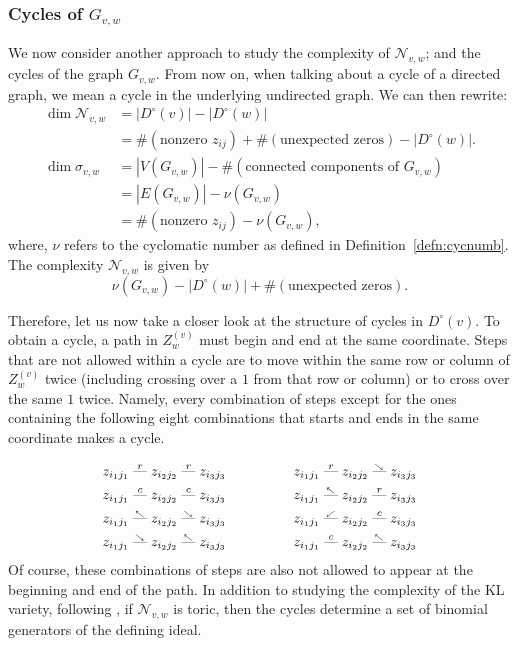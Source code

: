 \documentclass[11pt]{amsart}
\theoremstyle{definition}
\theoremstyle{definition}
\theoremstyle{definition}
\theoremstyle{definition}
\newcommand{\Gvwt}{G_{v,w}}
\newcommand{\Nvw}{\mathcal{N}_{v,w}}
\newcommand{\Dc}{D^{\circ}}
\newcommand{\dash}{\text{---}}
\newcommand{\Zg}{Z^{(v)}_w}
\newcommand{\cn}{\nu}
\begin{document}
\subsubsection{Cycles of $\Gvwt$}\label{subsec: cycles of Gvw}
\noindent We now consider another approach to study the complexity of $\Nvw$; and the cycles of the graph $\Gvwt$. From now on, when talking about a cycle of a directed graph, we mean a cycle in the underlying undirected graph. We can then rewrite:
\begin{align*}
\dim \Nvw &= |\Dc(v)| - |\Dc(w)| \\
&= \# (\text{nonzero } z_{ij} ) + \# (\text{unexpected zeros}) - |\Dc(w)|.\\
\dim \sigma_{v,w} &= |V(\Gvwt)| - \#(\text{connected components of } \Gvwt) \\
&= |E(\Gvwt)| - \cn( \Gvwt )\\
& = \# (\text{nonzero } z_{ij} )- \cn( \Gvwt),
\end{align*}
where, $\nu$ refers to the cyclomatic number as defined in Definition~\ref{defn:cycnumb}.
The complexity $\Nvw$ is given by
$$ \cn (\Gvwt) - |\Dc(w)| + \# (\text{unexpected zeros}).$$

Therefore, let us now take a closer look at the structure of cycles in $\Dc(v)$. To obtain a cycle, a path in $\Zg$ must begin and end at the same coordinate. Steps that are not allowed within a cycle are to move within the same row or column of $\Zg$ twice (including crossing over a $1$ from that row or column) or to cross over the same $1$ twice. Namely, every combination of steps except for the ones containing the following eight combinations that starts and ends in the same coordinate makes a cycle. 

\begin{align*}
z_{i_1 j_1} \stackrel{r}{\dash} z_{i_2 j_2} \stackrel{r}{\dash}  z_{i_3 j_3} \hspace{1.7cm}&
z_{i_1 j_1} \stackrel{r}{\dash} z_{i_2 j_2} \stackrel{_{\searrow}}{\dash}  z_{i_3 j_3} \\
z_{i_1 j_1} \stackrel{c}{\dash} z_{i_2 j_2} \stackrel{c}{\dash}  z_{i_3 j_3} \hspace{1.7cm} &
z_{i_1 j_1} \stackrel{_{\nwarrow}}{\dash} z_{i_2 j_2} \stackrel{r}{\dash}  z_{i_3 j_3}\\
z_{i_1 j_1} \stackrel{_{\nwarrow}}{\dash} z_{i_2 j_2} \stackrel{_{\searrow}}{\dash}  z_{i_3 j_3} \hspace{1.7cm} & z_{i_1 j_1} \stackrel{_{\swarrow}}{\dash} z_{i_2 j_2} \stackrel{c}{\dash}  z_{i_3 j_3} \\
z_{i_1 j_1} \stackrel{_{\searrow}}{\dash} z_{i_2 j_2} \stackrel{_{\nwarrow}}{\dash}  z_{i_3 j_3} \hspace{1.7cm} & 
z_{i_1 j_1} \stackrel{c}{\dash} z_{i_2 j_2} \stackrel{_{\nwarrow}}{\dash}  z_{i_3 j_3} 
\end{align*}
Of course, these combinations of steps are also not allowed to appear at the beginning and end of the path.
In addition to studying the complexity of the KL variety, following \cite[Proposition 4.3]{gitler2010ring}, if $\Nvw$ is toric, then the cycles determine a set of binomial generators of the defining ideal.
\end{document}
